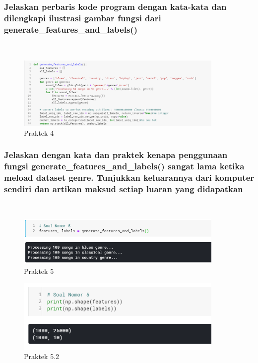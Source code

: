 \subsubsection{Jelaskan perbaris kode program dengan kata-kata dan dilengkapi ilustrasi gambar fungsi dari generate\_features\_and\_labels()}
\hfill\\

	
	
	\begin{figure}[H]
		\begin{center}
		 \includegraphics[width=10cm]{figures/1174076/figures6/praktek4.png}
		 \caption{Praktek 4}	
		\end{center}
	\end{figure}
 
 
\subsubsection{Jelaskan dengan kata dan praktek kenapa penggunaan fungsi generate\_features\_and\_labels() sangat lama ketika meload dataset genre. Tunjukkan keluarannya dari komputer sendiri dan artikan maksud setiap luaran yang didapatkan}
\hfill\\

	

	\begin{figure}[H]
		\begin{center}
		 \includegraphics[width=10cm]{figures/1174076/figures6/praktek5.png}
		 \caption{Praktek 5}	
		\end{center}
	\end{figure}
	
	\begin{figure}[H]
		\begin{center}
		 \includegraphics[width=10cm]{figures/1174076/figures6/praktek5_2.png}
		 \caption{Praktek 5.2}	
		\end{center}
	\end{figure}
 
